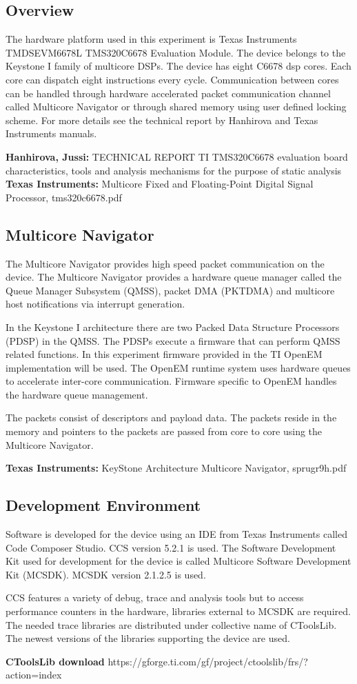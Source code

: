 \subsection{Overview}
The hardware platform used in this experiment is Texas Instruments TMDSEVM6678L TMS320C6678 Evaluation Module. The device belongs to the Keystone I family of multicore DSPs. The device has eight C6678 dsp cores. Each core can dispatch eight instructions every cycle. Communication between cores can be handled through hardware accelerated packet communication channel called Multicore Navigator or through shared memory using user defined locking scheme. For more details see the technical report by Hanhirova and Texas Instruments manuals.

\textbf{Hanhirova, Jussi:} TECHNICAL REPORT TI TMS320C6678 evaluation board characteristics, tools and analysis mechanisms for the purpose of static analysis\\
\textbf{Texas Instruments:} Multicore Fixed and Floating-Point Digital Signal Processor, tms320c6678.pdf

\subsection{Multicore Navigator}\label{navigator}
The Multicore Navigator provides high speed packet communication on the device. The Multicore Navigator provides a hardware queue manager called the Queue Manager Subsystem (QMSS), packet DMA (PKTDMA) and multicore host notifications via interrupt generation.

In the Keystone I architecture there are two Packed Data Structure Processors (PDSP) in the QMSS. The PDSPs execute a firmware that can perform QMSS related functions. In this experiment firmware provided in the TI OpenEM implementation will be used. The OpenEM runtime system uses hardware queues to accelerate inter-core communication. Firmware specific to OpenEM handles the hardware queue management.

The packets consist of descriptors and payload data. The packets reside in the memory and pointers to the packets are passed from core to core using the Multicore Navigator.

\textbf{Texas Instruments:} KeyStone Architecture Multicore Navigator, sprugr9h.pdf

\subsection{Development Environment}\label{MCSDK}
Software is developed for the device using an IDE from Texas Instruments called Code Composer Studio. CCS version 5.2.1 is used. The Software Development Kit used for development for the device is called Multicore Software Development Kit (MCSDK). MCSDK version 2.1.2.5 is used.

CCS features a variety of debug, trace and analysis tools but to access performance counters in the hardware, libraries external to MCSDK are required. The needed trace libraries are distributed under collective name of CToolsLib. The newest versions of the libraries supporting the device are used.

\textbf{CToolsLib download} https://gforge.ti.com/gf/project/ctoolslib/frs/?action=index
